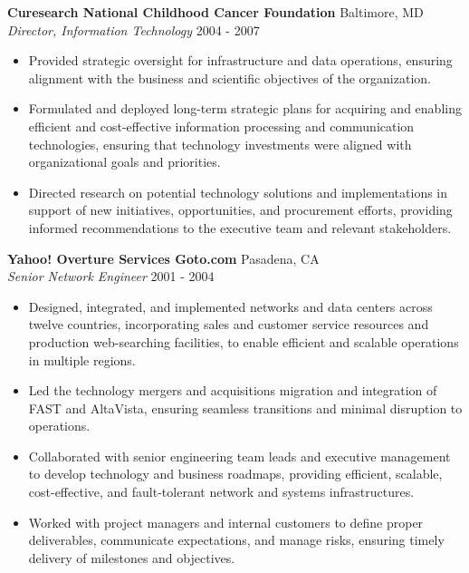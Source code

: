 \documentclass[a4paper]{article}
\begin{document}
\textbf{Curesearch \textbar{} National Childhood Cancer Foundation} \hfill Baltimore, MD\\
\textit{Director, Information Technology} \hfill 2004 - 2007\\
\vspace{-1mm}
\begin{itemize} \itemsep 1pt
	\item Provided strategic oversight for infrastructure and data operations, ensuring alignment with the business and scientific objectives of the organization.
	\item Formulated and deployed long-term strategic plans for acquiring and enabling efficient and cost-effective information processing and communication technologies, ensuring that technology investments were aligned with organizational goals and priorities.
	\item Directed research on potential technology solutions and implementations in support of new initiatives, opportunities, and procurement efforts, providing informed recommendations to the executive team and relevant stakeholders.
\end{itemize}
\textbf{Yahoo! \textbar{} Overture Services \textbar{} Goto.com} \hfill Pasadena, CA\\
\textit{Senior Network Engineer} \hfill 2001 - 2004\\
\vspace{-1mm}
\begin{itemize} \itemsep 1pt
	\item Designed, integrated, and implemented networks and data centers across twelve countries, incorporating sales and customer service resources and production web-searching facilities, to enable efficient and scalable operations in multiple regions.
	\item Led the technology mergers and acquisitions migration and integration of FAST and AltaVista, ensuring seamless transitions and minimal disruption to operations.
	\item Collaborated with senior engineering team leads and executive management to develop technology and business roadmaps, providing efficient, scalable, cost-effective, and fault-tolerant network and systems infrastructures.
	\item Worked with project managers and internal customers to define proper deliverables, communicate expectations, and manage risks, ensuring timely delivery of milestones and objectives.
\end{itemize}
\end{document}
